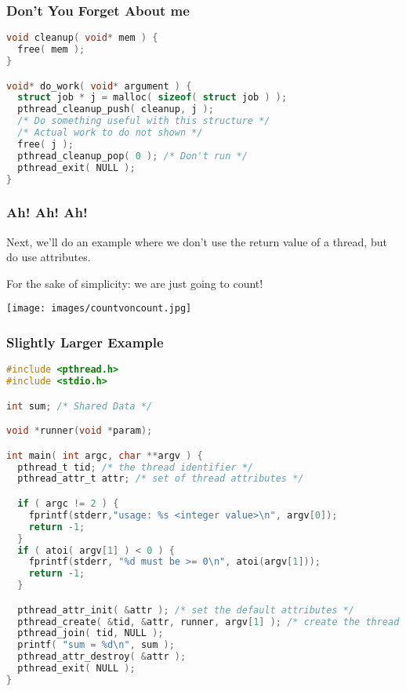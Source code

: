 \begin{frame}[fragile]
	\frametitle{Don't You Forget About me}

	\begin{lstlisting}[language=C]
void cleanup( void* mem ) {
  free( mem );
}

void* do_work( void* argument ) {
  struct job * j = malloc( sizeof( struct job ) );
  pthread_cleanup_push( cleanup, j );
  /* Do something useful with this structure */
  /* Actual work to do not shown */
  free( j );
  pthread_cleanup_pop( 0 ); /* Don't run */
  pthread_exit( NULL );
}
\end{lstlisting}


\end{frame}


\begin{frame}
	\frametitle{Ah! Ah! Ah!}

	Next, we'll do an example where we don't use the return value of a thread, but do use attributes.

	For the sake of simplicity: we are just going to count!

	\begin{center}
		\texttt{[image: images/countvoncount.jpg]}
	\end{center}


\end{frame}



\begin{frame}[fragile]
	\frametitle{Slightly Larger Example}

	\begin{lstlisting}[language=C]
#include <pthread.h>
#include <stdio.h>

int sum; /* Shared Data */

void *runner(void *param);

int main( int argc, char **argv ) {
  pthread_t tid; /* the thread identifier */
  pthread_attr_t attr; /* set of thread attributes */

  if ( argc != 2 ) {
    fprintf(stderr,"usage: %s <integer value>\n", argv[0]);
    return -1;
  }
  if ( atoi( argv[1] ) < 0 ) {
    fprintf(stderr, "%d must be >= 0\n", atoi(argv[1]));
    return -1;
  }

  pthread_attr_init( &attr ); /* set the default attributes */
  pthread_create( &tid, &attr, runner, argv[1] ); /* create the thread */
  pthread_join( tid, NULL );
  printf( "sum = %d\n", sum );
  pthread_attr_destroy( &attr );
  pthread_exit( NULL );
}
\end{lstlisting}


\end{frame}

